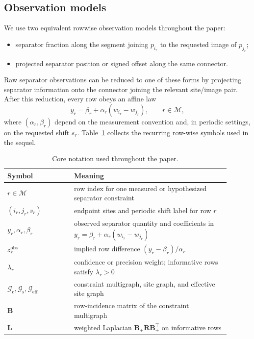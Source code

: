 \documentclass[preprint,12pt]{elsarticle}
\newcommand{\rowset}{\mathcal{M}}
\newcommand{\cgraph}{\mathcal{G}_{\mathrm{c}}}
\newcommand{\sitegraph}{\mathcal{G}_{\mathrm{s}}}
\newcommand{\effgraph}{\mathcal{G}_{\mathrm{eff}}}
\newcommand{\inc}{\mathbf{B}}
\newcommand{\lap}{\mathbf{L}}
\begin{document}
\subsection{Observation models}
We use two equivalent rowwise observation models throughout the paper:
\begin{itemize}
    \item separator fraction along the segment joining $p_{i_r}$ to the
    requested image of $p_{j_r}$;
    \item projected separator position or signed offset along the same
    connector.
\end{itemize}
Raw separator observations can be reduced to one of these forms by projecting
separator information onto the connector joining the relevant site/image pair.
After this reduction, every row obeys an affine law
\begin{equation}
    y_r=\beta_r+\alpha_r(w_{i_r}-w_{j_r}),
    \qquad r\in\rowset,
    \label{eq:row_affine}
\end{equation}
where $(\alpha_r,\beta_r)$ depend on the measurement convention and, in
periodic settings, on the requested shift $s_r$. Table~\ref{tab:notation}
collects the recurring row-wise symbols used in the sequel.

\begin{table}[t]
\centering
\small
\caption{Core notation used throughout the paper.}
\label{tab:notation}
\begin{tabular}{p{0.27\linewidth}p{0.63\linewidth}}
\toprule
Symbol & Meaning \\
\midrule
$r\in\rowset$ & row index for one measured or hypothesized separator constraint \\
$(i_r,j_r,s_r)$ & endpoint sites and periodic shift label for row $r$ \\
$y_r,\alpha_r,\beta_r$ & observed separator quantity and coefficients in $y_r=\beta_r+\alpha_r(w_{i_r}-w_{j_r})$ \\
$z_r^{\mathrm{obs}}$ & implied row difference $(y_r-\beta_r)/\alpha_r$ \\
$\lambda_r$ & confidence or precision weight; informative rows satisfy $\lambda_r>0$ \\
$\cgraph,\sitegraph,\effgraph$ & constraint multigraph, site graph, and effective site graph \\
$\inc$ & row-incidence matrix of the constraint multigraph \\
$\lap$ & weighted Laplacian $\inc_+ \mathbf{R} \inc_+^\top$ on informative rows \\
\bottomrule
\end{tabular}
\end{table}
\end{document}
